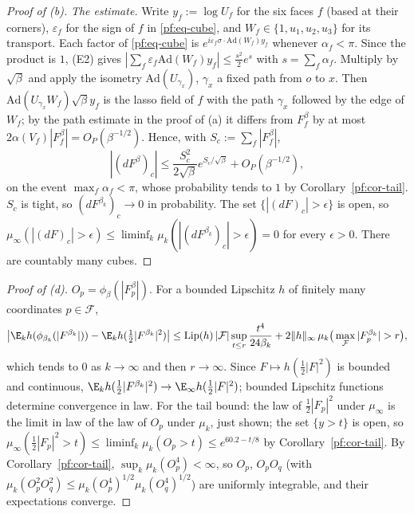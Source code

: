 \begin{proof}[Proof of (b)]
\emph{The estimate.} Write $y_f:=\log U_f$ for the six faces $f$ (based at their corners), $\varepsilon_f$ for the sign of $f$ in \eqref{pf:eq-cube}, and $W_f\in\{1,u_1,u_2,u_3\}$ for its transport. Each factor of \eqref{pf:eq-cube} is $e^{i\varepsilon_f\sigma\cdot\mathrm{Ad}(W_f)y_f}$ whenever $\alpha_f<\pi$. Since the product is $1$, (E2) gives $|\sum_f\varepsilon_f\mathrm{Ad}(W_f)y_f|\le\frac{s^2}2e^s$ with $s=\sum_f\alpha_f$. Multiply by $\sqrt\beta$ and apply the isometry $\mathrm{Ad}(U_{\gamma_x})$, $\gamma_x$ a fixed path from $o$ to $x$. Then $\mathrm{Ad}(U_{\gamma_x}W_f)\sqrt\beta y_f$ is the lasso field of $f$ with the path $\gamma_x$ followed by the edge of $W_f$; by the path estimate in the proof of (a) it differs from $F^\beta_f$ by at most $2\alpha(V_f)|F^\beta_f|=O_P(\beta^{-1/2})$. Hence, with $S_c:=\sum_f|F^\beta_f|$,
\[
|(dF^\beta)_c|\le\frac{S_c^2}{2\sqrt\beta}e^{S_c/\sqrt\beta}+O_P(\beta^{-1/2}),
\]
on the event $\max_f\alpha_f<\pi$, whose probability tends to $1$ by Corollary~\ref{pf:cor-tail}. $S_c$ is tight, so $(dF^{\beta_k})_c\to0$ in probability. The set $\{|(dF)_c|>\epsilon\}$ is open, so $\mu_\infty(|(dF)_c|>\epsilon)\le\liminf_k\mu_k(|(dF^{\beta_k})_c|>\epsilon)=0$ for every $\epsilon>0$. There are countably many cubes.
\end{proof}

\begin{proof}[Proof of (d)]
$O_p=\phi_{\beta}(|F^\beta_p|)$. For a bounded Lipschitz $h$ of finitely many coordinates $p\in\mathcal F$,
\[
\big|\E_kh(\phi_{\beta_k}(|F^{\beta_k}|))-\E_kh(\tfrac12|F^{\beta_k}|^2)\big|\le\mathrm{Lip}(h)\,|\mathcal F|\sup_{t\le r}\frac{t^4}{24\beta_k}+2\|h\|_\infty\,\mu_k\big(\max_{\mathcal F}|F^{\beta_k}_p|>r\big),
\]
which tends to $0$ as $k\to\infty$ and then $r\to\infty$. Since $F\mapsto h(\tfrac12|F|^2)$ is bounded and continuous, $\E_kh(\tfrac12|F^{\beta_k}|^2)\to\E_\infty h(\tfrac12|F|^2)$; bounded Lipschitz functions determine convergence in law. For the tail bound: the law of $\tfrac12|F_p|^2$ under $\mu_\infty$ is the limit in law of the law of $O_p$ under $\mu_k$, just shown; the set $\{y>t\}$ is open, so $\mu_\infty(\tfrac12|F_p|^2>t)\le\liminf_k\mu_k(O_p>t)\le e^{60.2-t/8}$ by Corollary~\ref{pf:cor-tail}. By Corollary~\ref{pf:cor-tail}, $\sup_k\mu_k(O_p^4)<\infty$, so $O_p$, $O_pO_q$ (with $\mu_k(O_p^2O_q^2)\le\mu_k(O_p^4)^{1/2}\mu_k(O_q^4)^{1/2}$) are uniformly integrable, and their expectations converge.
\end{proof}

